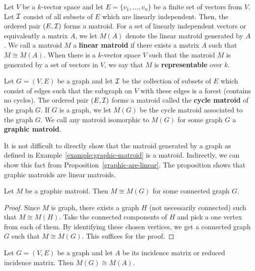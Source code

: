 \documentclass{puthesis-UG}
\begin{document}
\begin{example}  \label{linear-matroid}
	Let $V$ be a $k$-vector space and let $E = \{v_1, \ldots, v_n\}$ be a finite set of vectors from $V$. Let $\mathcal{I}$ consist of all subsets of $E$ which are linearly independent. Then, the ordered pair $(E, \mathcal{I})$ forms a matroid. For a set of linearly independent vectors or equivalently a matrix $A$, we let $M(A)$ denote the linear matroid generated by $A$. We call a matroid $M$ a \textbf{linear matroid} if there exists a matrix $A$ such that $M \cong M(A)$. When there is a $k$-vector space $V$ such that the matroid $M$ is generated by a set of vectors in $V$, we say that $M$ is \textbf{representable} over $k$. 
\end{example}

\begin{example}  \label{example:graphic-matroid}
	Let $G = (V, E)$ be a graph and let $\mathcal{I}$ be the collection of subsets of $E$ which consist of edges such that the subgraph on $V$ with these edges is a forest (contains no cycles). The ordered pair $(E, \mathcal{I})$ forms a matroid called the \textbf{cycle matroid} of the graph $G$. If $G$ is a graph, we let $M(G)$ be the cycle matroid associated to the graph $G$. We call any matroid isomorphic to $M(G)$ for some graph $G$ a \textbf{graphic matroid}. 
\end{example}

It is not difficult to directly show that the matroid generated by a graph as defined in Example~\ref{example:graphic-matroid} is a matroid. Indirectly, we can show this fact from Proposition~\ref{graphic-are-linear}. The proposition shows that graphic matroids are linear matroids.

\begin{prop} \label{prop:graphic-matroids-connected}
	Let $M$ be a graphic matroid. Then $M \cong M(G)$ for some connected graph $G$. 
\end{prop}
\begin{proof}
	Since $M$ is graph, there exists a graph $H$ (not necessarily connected) such that $M \cong M(H)$. Take the connected components of $H$ and pick a one vertex from each of them. By identifying these chosen vertices, we get a connected graph $G$ such that $M \cong M(G)$. This suffices for the proof. 
\end{proof}

\begin{prop} \label{graphic-are-linear}
	Let $G = (V, E)$ be a graph and let $A$ be its incidence matrix or reduced incidence matrix. Then $M(G) \cong M(A)$. 
\end{prop}
\end{document}
